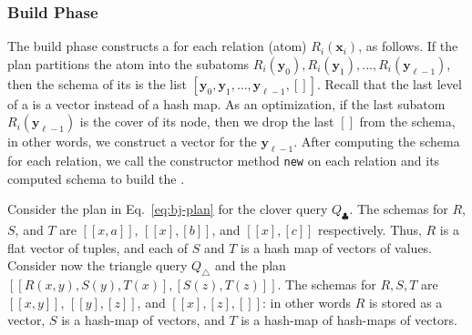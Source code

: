 \subsubsection*{Build Phase}
The build phase constructs a \GHT for each relation (atom)
$R_i(\bm x_i)$, as follows.  If the plan partitions the atom into the
subatoms $R_i(\bm y_0), R_i(\bm y_1), \ldots, R_i(\bm y_{\ell-1})$,
then the schema of its \GHT is the list
$[\bm y_0, \bm y_1, \ldots, \bm y_{\ell-1}, []]$.  Recall that the
last level of a \GHT is a vector instead of a hash map. As an
optimization, if the last subatom $R_i(\bm y_{\ell-1})$ is the cover
of its node, then we drop the last $[]$ from the schema, in other
words, we construct a vector for the $\bm y_{\ell-1}$.  After
computing the schema for each relation, we call the constructor method
\lstinline|new| on each relation and its computed schema to build the
\GHTs.

\begin{example}
  Consider the plan in Eq.~\eqref{eq:bj-plan} for the clover query
  $Q_\clubsuit$.  The \GHT schemas for $R$, $S$, and $T$ are
  $[[x, a]]$, $[[x], [b]]$, and $[[x], [c]]$ respectively.  Thus, $R$
  is a flat vector of tuples, and each of $S$ and $T$ is a hash map of
  vectors of values.  Consider now the triangle query $Q_{\triangle}$
  and the plan $[[R(x,y),S(y),T(x)],[S(z),T(z)]]$.  The \GHT
  schemas for $R, S, T$ are $[[x,y]]$, $[[y],[z]]$, and $[[x],[z],[]]$:
  in other words $R$ is stored as a vector, $S$ is a hash-map of
  vectors, and $T$ is a hash-map of hash-maps of vectors.
\end{example}

